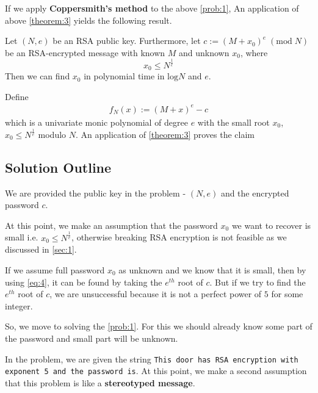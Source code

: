 \documentclass[10pt,twoside]{article}
\begin{document}
If we apply \textbf{Coppersmith's method} to the above \cref{prob:1}, An application of above \cref{theorem:3} yields the following result.

\begin{lemma} \label{lemma:1}
  Let $(N,e)$ be an RSA public key. Furthermore, let $c := (M + x_0)^e \; (\text{mod} \; N)$ be an RSA-encrypted message with known $M$ and unknown $x_0$, where
  $$x_0 \leq N^{\frac{1}{e}}$$
  Then we can find $x_0$ in polynomial time in $\text{log}N$ and $e$.
\end{lemma}

\begin{proofn}
  Define
  \begin{align}
    f_N(x) := (M + x)^e - c \label{eq:5}
  \end{align}
  which is a univariate monic polynomial of degree $e$ with the small root $x_0$, $x_0 \leq N^{\frac{1}{e}}$ modulo $N$. An application of \cref{theorem:3} proves the claim
\end{proofn}

\subsection{Solution Outline}
We are provided the public key in the problem - $(N, e)$ and the encrypted password $c$. \newline

At this point, we make an assumption that the password $x_0$ we want to recover is small i.e. $x_0 \leq N^{\frac{1}{e}}$, otherwise breaking RSA encryption is not feasible as we discussed in \cref{sec:1}. \newline

If we assume full password $x_0$ as unknown and we know that it is small, then by using \cref{eq:4}, it can be found by taking the $e^{th}$ root of $c$. \newline
But if we try to find the $e^{th}$ root of $c$, we are unsuccessful because it is not a perfect power of $5$ for some integer. \newline

So, we move to solving the \cref{prob:1}. For this we should already know some part of the password and small part will be unknown. \newline

In the problem, we are given the string \texttt{This door has RSA encryption with exponent 5 and the password is}. \newline
At this point, we make a second assumption that this problem is like a \textbf{stereotyped message}. \newline
\end{document}

